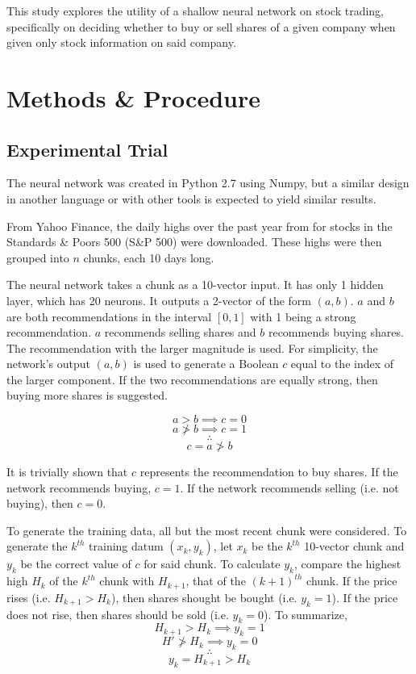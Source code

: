 \documentclass[twocolumn]{article}
\begin{document}
This study explores the utility of a shallow neural network on stock trading, specifically on deciding whether to buy or sell shares of a given company when given only stock information on said company.

\section{Methods \& Procedure}
\subsection{Experimental Trial}
The neural network was created in Python 2.7 using Numpy, but a similar design in another language or with other tools is expected to yield similar results.

From Yahoo Finance, the daily highs over the past year from for stocks in the Standards \& Poors 500 (S\&P 500) were downloaded. These highs were then grouped into $n$ chunks, each 10 days long.

The neural network takes a chunk as a 10-vector input. It has only 1 hidden layer, which has 20 neurons. It outputs a 2-vector of the form $(a, b)$. $a$ and $b$ are both recommendations in the interval $[0, 1]$ with 1 being a strong recommendation. $a$ recommends selling shares and $b$ recommends buying shares. The recommendation with the larger magnitude is used. For simplicity, the network's output $(a, b)$ is used to generate a Boolean $c$ equal to the index of the larger component. If the two recommendations are equally strong, then buying more shares is suggested.

$$a > b \implies c = 0$$
$$a \ngtr b \implies c = 1$$
$$\therefore$$
$$c = a \ngtr b$$

It is trivially shown that $c$ represents the recommendation to buy shares. If the network recommends buying, $c=1$. If the network recommends selling (i.e. not buying), then $c=0$.

To generate the training data, all but the most recent chunk were considered. To generate the $k^{th}$ training datum $(x_k, y_k)$, let $x_k$ be the $k^{th}$ 10-vector chunk and $y_k$ be the correct value of $c$ for said chunk. To calculate $y_k$, compare the highest high $H_k$ of the $k^{th}$ chunk with $H_{k+1}$, that of the $(k+1)^{th}$ chunk. If the price rises (i.e. $H_{k+1} > H_k$), then shares shought be bought (i.e. $y_k=1$). If the price does not rise, then shares should be sold (i.e. $y_k=0$). To summarize,
$$H_{k+1} > H_k \implies y_k = 1$$
$$H' \ngtr H_k \implies y_k = 0$$
$$\therefore$$
$$y_k = H_{k+1} > H_k$$
\end{document}
